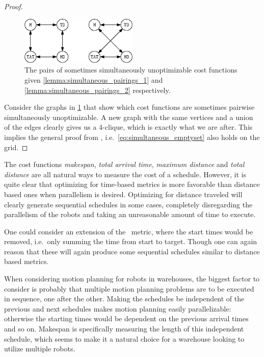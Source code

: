 \begin{proof}
	\begin{figure}[h]
		\centering
		\includegraphics[width=0.5\textwidth]{ipe/sim_thm.eps}
		\caption{
			The pairs of sometimes simultaneously unoptimizable cost functions given \cref{lemma:simultaneous_pairings_1} and \cref{lemma:simultaneous_pairings_2} respectively.
		}
		\label{fig:simultaneous_pairings_graph}
	\end{figure}

	Consider the graphs in \cref{fig:simultaneous_pairings_graph} that show which cost functions are sometimes pairwise simultaneously unoptimizable.
	A new graph with the same vertices and a union of the edges clearly gives us a 4-clique, which is exactly what we are after.
	This implies the general proof from \cite{corr/YuL15c}, i.e.~\cref{eq:simultaneous_emptyset} also holds on the grid.
\end{proof}

The cost functions \emph{makespan}, \emph{total arrival time}, \emph{maximum distance} and \emph{total distance} are all natural ways to measure the cost of a schedule.
However, it is quite clear that optimizing for time-based metrics is more favorable than distance based ones when parallelism is desired.
Optimizing for distance traveled will clearly generate sequential schedules in some cases, completely disregarding the parallelism of the robots and taking an unreasonable amount of time to execute.

One could consider an extension of the \ metric, where the start times would be removed, i.e.~only summing the time from start to target.
Though one can again reason that these will again produce some sequential schedules similar to distance based metrics.

When considering motion planning for robots in warehouses, the biggest factor to consider is probably that multiple motion planning problems are to be executed in sequence, one after the other.
Making the schedules be independent of the previous and next schedules makes motion planning easily parallelizable: otherwise the starting times would be dependent on the previous arrival times and so on.
Makespan is specifically measuring the length of this independent schedule, which seems to make it a natural choice for a warehouse looking to utilize multiple robots.




